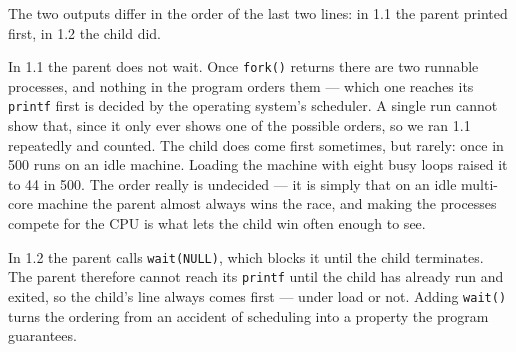 
The two outputs differ in the order of the last two lines: in 1.1 the parent
printed first, in 1.2 the child did.

In 1.1 the parent does not wait. Once \texttt{fork()} returns there are two
runnable processes, and nothing in the program orders them --- which one reaches
its \texttt{printf} first is decided by the operating system's scheduler. A
single run cannot show that, since it only ever shows one of the possible
orders, so we ran 1.1 repeatedly and counted. The child does come first
sometimes, but rarely: once in 500 runs on an idle machine. Loading the machine
with eight busy loops raised it to 44 in 500. The order really is undecided ---
it is simply that on an idle multi-core machine the parent almost always wins
the race, and making the processes compete for the CPU is what lets the child
win often enough to see.

In 1.2 the parent calls \texttt{wait(NULL)}, which blocks it until the child
terminates. The parent therefore cannot reach its \texttt{printf} until the
child has already run and exited, so the child's line always comes first ---
under load or not. Adding \texttt{wait()} turns the ordering from an accident of
scheduling into a property the program guarantees.
